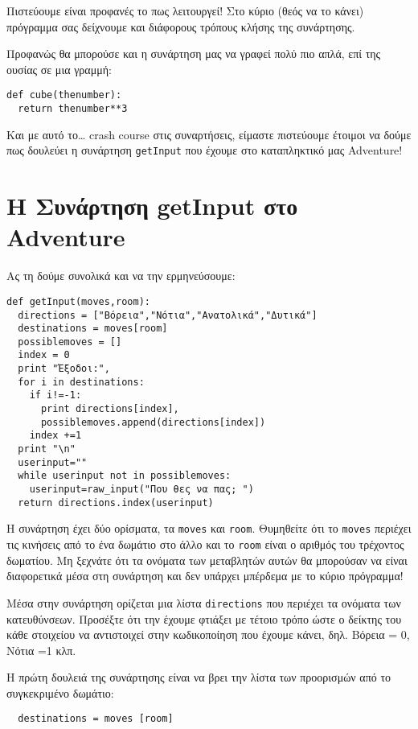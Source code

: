 Πιστεύουμε είναι προφανές το πως λειτουργεί! Στο κύριο (θεός να το κάνει)
πρόγραμμα σας δείχνουμε και διάφορους τρόπους κλήσης της συνάρτησης.

Προφανώς θα μπορούσε και η συνάρτηση μας να γραφεί πολύ πιο απλά,
επί της ουσίας σε μια γραμμή:

\begin{verbatim}
def cube(thenumber):
  return thenumber**3
\end{verbatim}

Και με αυτό το\ldots{} crash course στις συναρτήσεις, είμαστε πιστεύουμε
έτοιμοι να δούμε πως δουλεύει η συνάρτηση {\tt getInput} που έχουμε
στο καταπληκτικό μας Adventure!
%
\section{Η Συνάρτηση getInput στο Adventure}
%
Ας τη δούμε συνολικά και να την ερμηνεύσουμε:

\begin{verbatim}
def getInput(moves,room):
  directions = ["Βόρεια","Νότια","Ανατολικά","Δυτικά"]
  destinations = moves[room]
  possiblemoves = []
  index = 0
  print "Έξοδοι:",
  for i in destinations:
    if i!=-1:
      print directions[index],
      possiblemoves.append(directions[index])
    index +=1
  print "\n"
  userinput=""
  while userinput not in possiblemoves:
    userinput=raw_input("Που θες να πας; ")
  return directions.index(userinput)
\end{verbatim}

Η συνάρτηση έχει δύο ορίσματα, τα {\tt moves} και {\tt room}. Θυμηθείτε ότι το {\tt moves}
περιέχει τις κινήσεις από το ένα δωμάτιο στο άλλο και το {\tt room} είναι ο
αριθμός του τρέχοντος δωματίου. Μη ξεχνάτε ότι τα ονόματα των μεταβλητών
αυτών θα μπορούσαν να είναι διαφορετικά μέσα στη συνάρτηση και δεν υπάρχει
μπέρδεμα με το κύριο πρόγραμμα!

Μέσα στην συνάρτηση ορίζεται μια λίστα {\tt directions} που περιέχει
τα ονόματα των κατευθύνσεων. Προσέξτε ότι την έχουμε φτιάξει με τέτοιο
τρόπο ώστε ο δείκτης του κάθε στοιχείου να αντιστοιχεί στην κωδικοποίηση
που έχουμε κάνει, δηλ. Βόρεια = 0, Νότια =1 κλπ.

Η πρώτη δουλειά της συνάρτησης είναι να βρει την λίστα των προορισμών
από το συγκεκριμένο δωμάτιο:

\begin{verbatim}
  destinations = moves [room]
\end{verbatim}

